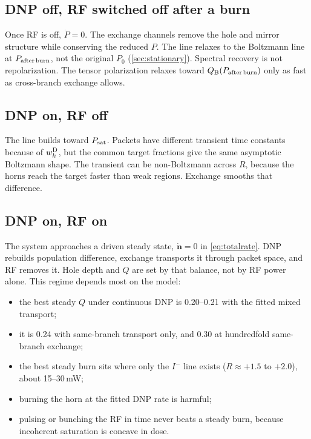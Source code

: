 \documentclass[11pt]{article}
\newcommand{\Iminus}{I^{-}}
\begin{document}
\subsection{DNP off, RF switched off after a burn}

Once RF is off, \(\dot P=0\). The exchange channels remove the hole and mirror structure while
conserving the reduced \(P\). The line relaxes to the Boltzmann line at \(P_{\rm after\,burn}\),
not the original \(P_0\) (\cref{sec:stationary}). Spectral recovery is not repolarization. The
tensor polarization relaxes toward \(Q_{\rm B}(P_{\rm after\,burn})\) only as fast as
cross-branch exchange allows.

\subsection{DNP on, RF off}

The line builds toward \(P_{\rm sat}\). Packets have different transient time constants because
of \(w^{\rm D}_k\), but the common target fractions give the same asymptotic Boltzmann shape. The
transient can be non-Boltzmann across \(R\), because the horns reach the target faster than
weak regions. Exchange smooths that difference.

\subsection{DNP on, RF on}

The system approaches a driven steady state, \(\dot{\bm n}=0\) in \cref{eq:totalrate}. DNP
rebuilds population difference, exchange transports it through packet space, and RF removes it.
Hole depth and \(Q\) are set by that balance, not by RF power alone. This regime depends most on
the model:
\begin{itemize}
\item the best steady \(Q\) under continuous DNP is 0.20--0.21 with the fitted mixed transport;
\item it is 0.24 with same-branch transport only, and 0.30 at hundredfold same-branch exchange;
\item the best steady burn sits where only the \(\Iminus\) line exists (\(R\approx+1.5\) to
\(+2.0\)), about 15--30\,mW;
\item burning the horn at the fitted DNP rate is harmful;
\item pulsing or bunching the RF in time never beats a steady burn, because incoherent saturation
is concave in dose.
\end{itemize}
\end{document}
